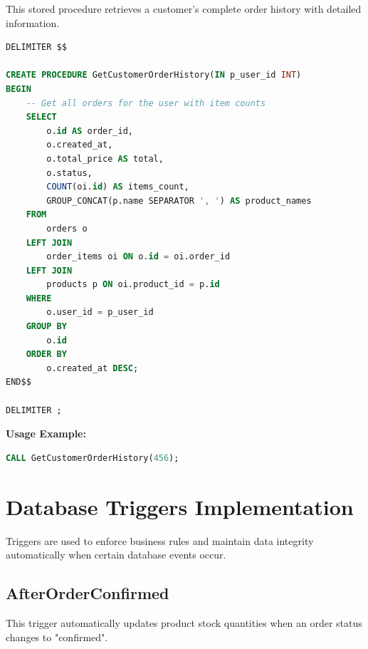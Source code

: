 \documentclass[14pt,a4paper]{article}
\begin{document}
This stored procedure retrieves a customer's complete order history with detailed information.

\begin{lstlisting}[language=SQL, caption={GetCustomerOrderHistory Stored Procedure}, label={lst:customer-order-history}]
DELIMITER $$

CREATE PROCEDURE GetCustomerOrderHistory(IN p_user_id INT)
BEGIN
    -- Get all orders for the user with item counts
    SELECT 
        o.id AS order_id,
        o.created_at,
        o.total_price AS total,
        o.status,
        COUNT(oi.id) AS items_count,
        GROUP_CONCAT(p.name SEPARATOR ', ') AS product_names
    FROM 
        orders o
    LEFT JOIN 
        order_items oi ON o.id = oi.order_id
    LEFT JOIN 
        products p ON oi.product_id = p.id
    WHERE 
        o.user_id = p_user_id
    GROUP BY 
        o.id
    ORDER BY 
        o.created_at DESC;
END$$

DELIMITER ;
\end{lstlisting}

\textbf{Usage Example:}
\begin{lstlisting}[language=SQL, numbers=none]
CALL GetCustomerOrderHistory(456);
\end{lstlisting}

\section{Database Triggers Implementation}

Triggers are used to enforce business rules and maintain data integrity automatically when certain database events occur.

\subsection{AfterOrderConfirmed}

This trigger automatically updates product stock quantities when an order status changes to "confirmed".
\end{document}
